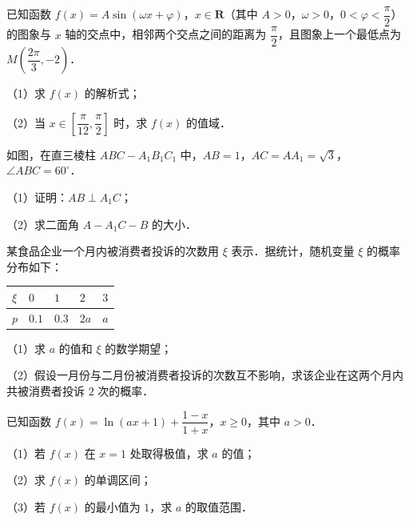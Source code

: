 \begingroup
\renewenvironment{question}{\Needspace{0.5\textheight}}{}
\begin{question}
已知函数 $f(x)=A\sin(\omega x+\varphi)$，$x\in\mathbf R$（其中 $A>0$，$\omega>0$，$0<\varphi<\dfrac\pi2$）的图象与 $x$ 轴的交点中，相邻两个交点之间的距离为 $\dfrac\pi2$，且图象上一个最低点为 $M\left(\dfrac{2\pi}3,-2\right)$．

（1）求 $f(x)$ 的解析式；

（2）当 $x\in\left[\dfrac\pi{12},\dfrac\pi2\right]$ 时，求 $f(x)$ 的值域．

\Needspace{0.4\textheight}
\end{question}
\endgroup
\begin{question}
如图，在直三棱柱 $ABC-A_1B_1C_1$ 中，$AB=1$，$AC=AA_1=\sqrt3$，$\angle ABC=60^\circ$．

（1）证明：$AB\perp A_1C$；

（2）求二面角 $A-A_1C-B$ 的大小．
\nopagebreak[4]
\begin{center}\end{center}
\nopagebreak[4]
\end{question}
\begin{question}
某食品企业一个月内被消费者投诉的次数用 $\xi$ 表示．据统计，随机变量 $\xi$ 的概率分布如下：

\begin{center}
\begin{tabular}{lllll}
\toprule
$\xi$ & $0$ & $1$ & $2$ & $3$ \\
\midrule
$p$ & $0.1$ & $0.3$ & $2a$ & $a$ \\
\bottomrule
\end{tabular}
\end{center}

（1）求 $a$ 的值和 $\xi$ 的数学期望；

（2）假设一月份与二月份被消费者投诉的次数互不影响，求该企业在这两个月内共被消费者投诉 $2$ 次的概率．

\end{question}
\begin{question}
已知函数 $f(x)=\ln(ax+1)+\dfrac{1-x}{1+x}$，$x\geqslant0$，其中 $a>0$．

（1）若 $f(x)$ 在 $x=1$ 处取得极值，求 $a$ 的值；

（2）求 $f(x)$ 的单调区间；

（3）若 $f(x)$ 的最小值为 $1$，求 $a$ 的取值范围．

\Needspace{0.4\textheight}
\end{question}
